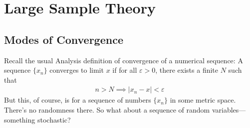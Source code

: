 \documentclass[12pt]{article}
\theoremstyle{plain}
\theoremstyle{definition}
\theoremstyle{remark}
\begin{document}




\clearpage
\section{Large Sample Theory}


\subsection{Modes of Convergence}

Recall the usual Analysis definition of convergence of a numerical
sequence: A sequence $\{x_n\}$ converges to limit $x$ if for all
$\varepsilon> 0$, there exists a finite $N$ such that
\begin{align*}
  n > N \implies |x_n - x| < \varepsilon
\end{align*}
But this, of course, is for a sequence of numbers $\{x_n\}$ in some
metric space. There's no randomness there. So what about a sequence of
random variables---something stochastic?
\end{document}
